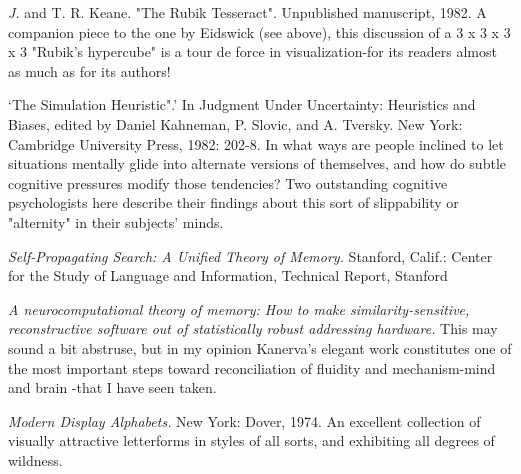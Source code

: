  {\sl J.} and T. R. Keane. "The Rubik Tesseract". Unpublished manuscript, 1982. A companion piece to the one by Eidswick (see above), this discussion of a 3 x 3 x 3 x 3 "Rubik's hypercube" is a tour de force in visualization-for its readers almost as much as for its authors!

 `The Simulation Heuristic".' In Judgment Under Uncertainty: Heuristics and Biases, edited by Daniel Kahneman, P. Slovic, and A. Tversky. New York: Cambridge University Press, 1982: 202-8. In what ways are people inclined to let situations mentally glide into alternate versions of themselves, and how do subtle cognitive pressures modify those tendencies? Two outstanding cognitive psychologists here describe their findings about this sort of slippability or "alternity" in their subjects' minds.

 {\sl Self-Propagating Search: A Unified Theory of Memory.} Stanford, Calif.: Center for the Study of Language and Information, Technical Report, Stanford

 {\sl A neurocomputational theory of memory: How to make similarity-sensitive, reconstructive software out of statistically robust addressing hardware.} This may sound a bit abstruse, but in my opinion Kanerva's elegant work constitutes one of the most important steps toward reconciliation of fluidity and mechanism-mind and brain -that I have seen taken.

 {\sl Modern Display Alphabets.} New York: Dover, 1974. An excellent collection of visually attractive letterforms in styles of all sorts, and exhibiting all degrees of wildness.

